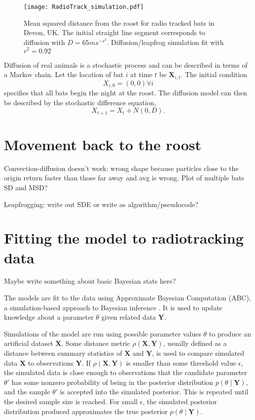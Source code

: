 \begin{figure} [h]
    \centering
        \texttt{[image: RadioTrack\_simulation.pdf]}
        \caption{Mean squared distance from the roost for radio tracked bats in Devon, UK. The initial straight line segment corresponds to diffusion with $D = 65 ms^{-s^2}$. Diffusion/leapfrog simulation fit with $r^2 = 0.92$}
    \label{fig:radiotrack_fit}
\end{figure}
%
Diffusion of real animals is a stochastic process and can be described in terms of a Markov chain. Let the location of bat $i$ at time $t$ be $\bm{X}_{i,t}$. The initial condition
%
\begin{equation}
X_{i,0} = (0,0)         \forall i
\end{equation}
%
specifies that all bats begin the night at the roost. The diffusion model can then be described by the stochastic difference equation,
%
\begin{equation}
X_{t+1} = X_t + N(0,D) .
\end{equation}
%



\section{Movement back to the roost}

Convection-diffusion doesn't work: wrong shape because particles close to the origin return faster than those far away and avg is wrong.
Plot of multiple bats SD and MSD?

Leapfrogging: write out SDE or write as algorithm/pseudocode?

\section{Fitting the model to radiotracking data}

{\huge Maybe write something about basic Bayesian stats here?}

The models are fit to the data using Approximate Bayesian Computation (ABC), a simulation-based approach to Bayesian inference \cite{Beaumont2002, Sisson2010}. It is used to update knowledge about a parameter $\theta$ given related data $\bm{Y}$.

Simulations of the model are run using possible parameter values $\theta$ to produce an artificial dataset $\bm{X}$. Some distance metric $\rho (\bm{X}, \bm{Y}) $, usually defined
as a distance between summary statistics of $\bm{X}$ and $\bm{Y}$, is used to
compare simulated data $\bm{X}$ to observations $\bm{Y}$. If $\rho (\bm{X},
\bm{Y}) $ is smaller than some threshold value $\epsilon$, the simulated data is
close enough to observations that the candidate parameter $\theta'$ has some
nonzero probability of being in the posterior distribution $ p(\theta \mid
\bm{Y})$, and the sample $\theta'$ is accepted into the simulated posterior. This is repeated until the desired sample size is reached. For small $\epsilon$, the simulated posterior distribution produced approximates the
true posterior $ p(\theta \mid \bm{Y})$.

